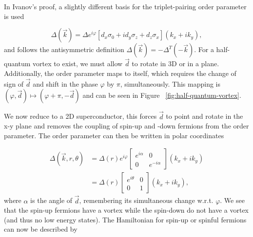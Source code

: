 In Ivanov's proof, a slightly different basis for the triplet-pairing order parameter is used

\begin{equation}
  \Delta (\vec{k}) = \Delta e^{i\varphi} \left[ d_x \sigma_0 + i d_y \sigma_z + d_z \sigma_x \right] (k_x + i k_y),
\end{equation}
and follows the antisymmetric definition $\Delta(\vec{k}) = -\Delta^T (-\vec{k})$.
For a half-quantum vortex to exist, we must allow $\vec{d}$ to rotate in 3D or in a plane.
Additionally, the order parameter maps to itself, which requires the change of sign of $\vec{d}$ and shift in the phase $\varphi$ by $\pi$, simultaneously.
This mapping is
$(\varphi, \vec{d}) \mapsto (\varphi+\pi,-\vec{d})$
and can be seen in Figure ~\ref{fig:half-quantum-vortex}.

We now reduce to a 2D superconductor, this forces $\vec{d}$ to point and rotate in the x-y plane and removes the coupling of spin-up and -down fermions from the order parameter.
The order parameter can then be written in polar coordinates

\begin{align}
  \Delta (\vec{k},r,\theta) &= \Delta(r) e^{i\varphi}
  \begin{bmatrix}
    e^{i\alpha} & 0 \\
    0 & e^{-i\alpha}
  \end{bmatrix}
  (k_x + i k_y) \nonumber \\
  &= \Delta(r)
  \begin{bmatrix}
    e^{i\theta} & 0 \\
    0 & 1
  \end{bmatrix}
  (k_x + i k_y),
\end{align}
where $\alpha$ is the angle of $\vec{d}$, remembering its simultaneous change w.r.t. $\varphi$.
We see that the spin-up fermions have a vortex while the spin-down do not have a vortex (and thus no low energy states).
The Hamiltonian for spin-up or spinful fermions can now be described by


